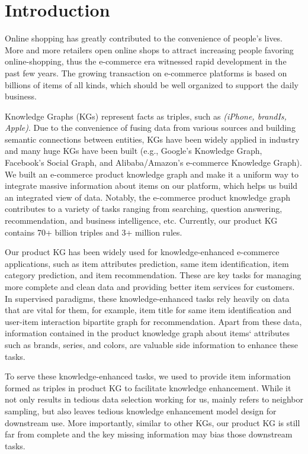 \section{Introduction}
Online shopping has greatly contributed to the convenience of people's lives. More and more retailers open online shops to attract increasing people favoring online-shopping, thus the e-commerce era witnessed rapid development in the past few years. The growing transaction on e-commerce platforms is based on billions of items of all kinds, which should be well organized to support the daily business. 

Knowledge Graphs (KGs) represent facts as triples, such as \emph{(iPhone, brandIs, Apple)}. Due to the convenience of fusing data from various sources and building semantic connections between entities, KGs have been widely applied in industry and many huge KGs have been built (e.g., Google's Knowledge Graph, Facebook's Social Graph, and Alibaba/Amazon's e-commerce Knowledge Graph). We built an e-commerce product knowledge graph and make it a uniform way to integrate massive information about items on our platform, which helps us build an integrated view of data. Notably, the e-commerce product knowledge graph contributes to a variety of tasks ranging from searching, question answering, recommendation, and business intelligence, etc. Currently, our product KG contains 70+ billion triples and 3+ million rules. 

Our product KG has been widely used for knowledge-enhanced e-commerce applications, such as item attributes prediction, same item identification, item category prediction, and item recommendation. These are key tasks for managing more complete and clean data and providing better item services for customers. In supervised paradigms, these knowledge-enhanced tasks rely heavily on data that are vital for them, for example, item title for same item identification and user-item interaction bipartite graph for recommendation. Apart from these data, information contained in the product knowledge graph about items‘ attributes such as brands, series, and colors, are valuable side information to enhance these tasks. 

To serve these knowledge-enhanced tasks, we used to provide item information formed as triples in product KG to facilitate knowledge enhancement. While it not only results in tedious data selection working for us, mainly refers to neighbor sampling, but also leaves tedious knowledge enhancement model design for downstream use. More importantly, similar to other KGs, our product KG is still far from complete and the key missing information may bias those downstream tasks. 

